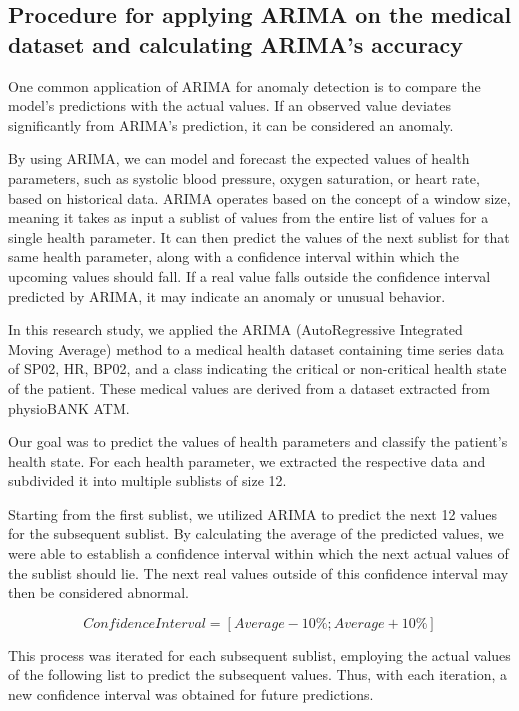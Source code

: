 \documentclass[conference]{IEEEtran}
\begin{document}
\subsection{Procedure for applying ARIMA on the medical dataset and calculating ARIMA's accuracy}

One common application of ARIMA for anomaly detection is to compare the model's predictions with the actual values. If an observed value deviates significantly from ARIMA's prediction, it can be considered an anomaly.



By using ARIMA, we can model and forecast the expected values of health parameters, such as systolic blood pressure, oxygen saturation, or heart rate, based on historical data. 
ARIMA operates based on the concept of a window size, meaning it takes as input a sublist of values from the entire list of values for a single health parameter. It can then predict the values of the next sublist for that same health parameter, along with a confidence interval within which the upcoming values should fall.
If a real value falls outside the confidence interval predicted by ARIMA, it may indicate an anomaly or unusual behavior.

In this research study, we applied the ARIMA (AutoRegressive Integrated Moving Average) method to a medical health dataset containing time series data of SP02, HR, BP02, and a class indicating the critical or non-critical health state of the patient.
These medical values are derived from a dataset extracted from physioBANK ATM. 

Our goal was to predict the values of health parameters and classify the patient's health state.
For each health parameter, we extracted the respective data and subdivided it into multiple sublists of size 12.

Starting from the first sublist, we utilized ARIMA to predict the next 12 values for the subsequent sublist. By calculating the average of the predicted values, we were able to establish a confidence interval within which the next actual values of the sublist should lie. The next real values outside of this confidence interval may then be considered abnormal.

   \[
   Confidence Interval = [Average - 10\% ; Average + 10\%]
   \] 


This process was iterated for each subsequent sublist, employing the actual values of the following list to predict the subsequent values. Thus, with each iteration, a new confidence interval was obtained for future predictions.
\end{document}
